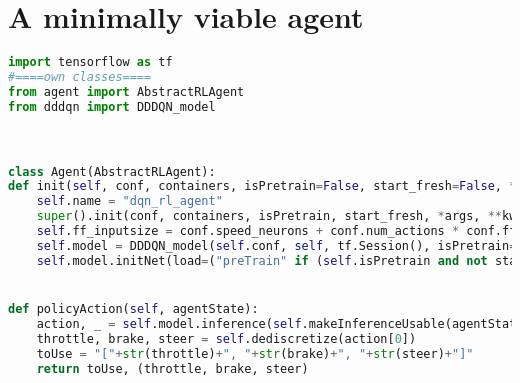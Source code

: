 


\chapter{A minimally viable agent} %

\label{AppendixD} %

\begin{lstlisting}[language=Python, frame=none]
import tensorflow as tf
#====own classes====
from agent import AbstractRLAgent
from dddqn import DDDQN_model 



class Agent(AbstractRLAgent):    
def init(self, conf, containers, isPretrain=False, start_fresh=False, *args, **kwargs):
	self.name = "dqn_rl_agent"
	super().init(conf, containers, isPretrain, start_fresh, *args, **kwargs)
	self.ff_inputsize = conf.speed_neurons + conf.num_actions * conf.ff_stacksize #32
	self.model = DDDQN_model(self.conf, self, tf.Session(), isPretrain=isPretrain)
	self.model.initNet(load=("preTrain" if (self.isPretrain and not start_fresh) else (not start_fresh)))


def policyAction(self, agentState):
	action, _ = self.model.inference(self.makeInferenceUsable(agentState)) 
	throttle, brake, steer = self.dediscretize(action[0])
	toUse = "["+str(throttle)+", "+str(brake)+", "+str(steer)+"]"
	return toUse, (throttle, brake, steer)
\end{lstlisting}%

